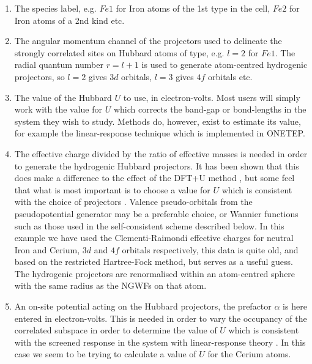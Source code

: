\documentclass[a4paper,oneside,11pt]{article}
\numberwithin{equation}{section}
\begin{document}
\begin{enumerate}
\item The species label, e.g. $Fe1$ for Iron atoms of the 1st type in the cell, $Fe2$ for Iron atoms of a 2nd kind etc.

\item The angular momentum channel of the projectors
used to delineate the strongly correlated sites on Hubbard atoms of type, e.g. $l=2$ for $Fe1$. 
The radial quantum number $r=l+1$ is used to generate atom-centred hydrogenic projectors, so $l=2$ gives $3d$ orbitals, $l=3$ gives $4f$ orbitals etc.

\item The value of the Hubbard $U$ to use, in electron-volts. 
Most users will simply work with the value for $U$ which corrects the
band-gap or bond-lengths in the system they wish to study. Methods 
do, however, exist to estimate its value, for example the linear-response technique \cite{Cococcioni1, Cococcioni2} which is 
implemented in ONETEP. 

\item The effective charge divided by the ratio of effective masses 
is needed in order to generate the hydrogenic Hubbard projectors. It has been 
shown that this does make a difference to the effect of the DFT+U method \cite{Pickett}, but 
some feel that what is most important is to choose a value for $U$ which is
consistent with the choice of projectors \cite{Cococcioni1}. Valence pseudo-orbitals from the
pseudopotential generator may be a preferable choice, or Wannier functions
such as those used in the self-consistent scheme described below. 
In this example we have used the Clementi-Raimondi \cite{Clementi1,Clementi2} effective charges for 
neutral Iron and Cerium, $3d$ and $4f$ orbitals respectively, this data is quite
old, and based on the restricted Hartree-Fock method, but serves as a useful
guess. The hydrogenic projectors are renormalised within an atom-centred sphere
with the same radius as the NGWFs on that atom.

\item An on-site potential acting on the Hubbard projectors, 
the prefactor $\alpha$ is here entered in electron-volts. This is needed in 
order to vary the occupancy of the correlated subspace in order to determine
the value of $U$ which is consistent with the screened response in the system
with linear-response theory \cite{Cococcioni1, Cococcioni2}. In this case we seem to be trying to calculate a
value of $U$ for the Cerium atoms.


\end{enumerate}
\end{document}
